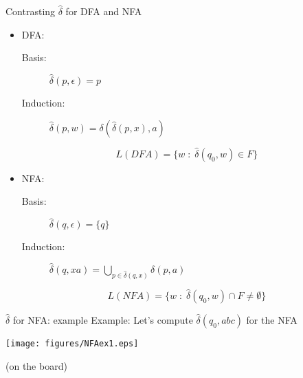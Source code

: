 \documentclass{prosper}%
\begin{document}
\begin{slide}{Contrasting $\hat{\delta}$ for DFA and NFA}
\begin{itemize}
\item DFA: 
\begin{description}
\item[Basis:] $\hat{\delta}(p, \epsilon) = p$
\item[Induction:] $\hat{\delta}(p,w) = \delta(\hat{\delta}(p, x), a)$
\end{description}
\[
L(DFA)= \{w\;:\; \hat{\delta}(q_0, w) \in F\}
\]
\item NFA:
\begin{description}
\item[Basis:] $\hat{\delta}(q, \epsilon)=\{q\}$
\item[Induction:] $\hat{\delta}(q, xa) = \bigcup_{p\in\hat\delta(q, x)}\delta(p, a)$

\end{description}
\[
L(NFA) = \{w\;:\; \hat{\delta}(q_0, w)\cap F\neq \emptyset\}
\]
\end{itemize}
\end{slide}

\begin{slide}{$\hat{\delta}$ for NFA: example}
Example: Let's compute $\hat{\delta}(q_0, abc)$ for the NFA
\vspace{1cm}
\begin{center}
\texttt{[image: figures/NFAex1.eps]}
\end{center} 
(on the board)
\end{slide}
\end{document}
